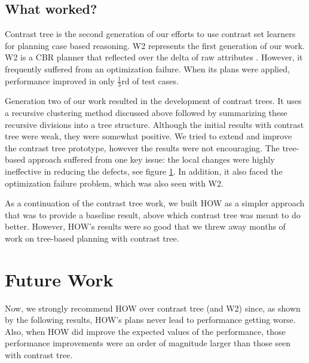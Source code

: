 \documentclass[conference]{IEEEtran}
\begin{document}
    
\subsection{What worked?}
Contrast tree is the second generation of our efforts to use contrast set learners for planning case based reasoning. W2 represents the first generation of our work. W2 is a CBR planner that reflected over the delta of raw attributes \cite{}. However, it frequently suffered from an optimization failure. When its plans were applied, performance improved in only  $\tfrac{1}{3}$rd of test cases. 

Generation two of our work resulted in the development of contrast trees. It uses a recursive clustering method discussed above followed by summarizing these recursive divisions into a tree structure. Although the initial results with contrast tree were weak, they were somewhat positive. We tried to extend and improve the contrast tree prototype, however the results were not encouraging. The tree-based approach suffered from one key issue: the local changes were highly ineffective in reducing the defects, see figure \ref{}. In addition, it also faced the optimization failure problem, which was also seen with W2. 

As a continuation of the contrast tree work, we built HOW as a simpler approach that was to provide a baseline result, above which contrast tree was meant to do better. However, HOW’s results were so good that we threw away months of work on tree-based planning with contrast tree. 
\section{Future Work}
Now, we strongly recommend HOW over contrast tree (and W2) since, as shown by the following results, HOW’s plans never lead to performance getting worse. Also, when HOW did improve the expected values of the performance, those performance improvements were an order of magnitude larger than those seen with contrast tree. 
\end{document}
